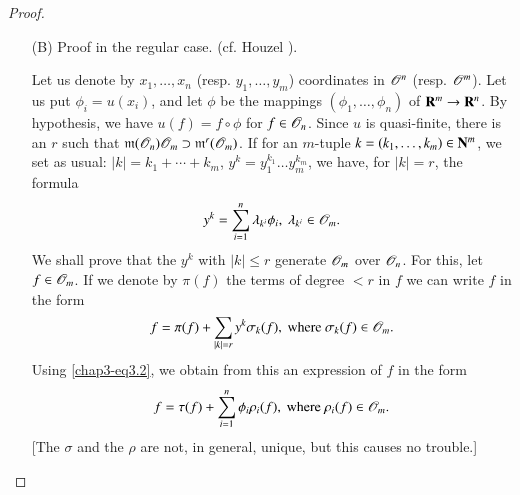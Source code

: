 \begin{proof}
\begin{itemize}
Let us, therefore, suppose that $\frakp$ is finitely generated, and let $g_{1},\ldots,g_{p}$ be a system of generators. Let us denote by $y_{i}(1\leq i\leq n)$ resp. $z_{j}(n+1\leq j\leq n+p)$ generators of the maximal ideal of $\scrO_{n}$ (resp. $\scrO_{n+p}$), and let $v$ be the morphism $\scrO_{n+p}\to \scrO_{m}$ defined by the formulas
\begin{align*}
& v(z_{i})=\widetilde{u}(y_{i}), \ 1\leq i\leq n\\
& v(z_{n+j})=g_{j}, \ 1\leq j\leq p.
\end{align*}
The morphism $v$ is still quasi-finite; if $v$ is finite, then so is $u$. We are thus reduced, after a change of notation, to the case $A=\scrO_{n}$, $B=\scrO_{m}$.

\item[(B)] {\rm Proof in the regular case.} (cf. Houzel \cite{C. Houzel : 1}).

Let us denote by $x_{1},\ldots,x_{n}$ (resp. $y_{1},\ldots,y_{m}$) coordinates in $\mathscr{O}^{n}$ (resp. $\mathscr{O}^{m}$). Let us put $\phi_{i}=u(x_{i})$, and let $\phi$ be the mappings $(\phi_{1},\ldots,\phi_{n})$ of $\mathbf{R}^{m}\to \mathbf{R}^{n}$. By hypothesis, we have $u(f)=f\circ \phi$ for $f\in \mathscr{O}_{n}$. Since $u$ is quasi-finite, there is an $r$ such that $\mathfrak{m}(\mathscr{O}_{n})\mathscr{O}_{m}\supset \mathfrak{m}^{r}(\mathscr{O}_{m})$. If for an $m$-tuple $k=(k_{1},\ldots,k_{m})\in \mathbf{N}^{m}$, we set as usual: $|k|=k_{1}+\cdots+k_{m}$, $y^{k}=y^{k_{1}}_{1}\ldots y^{k_{m}}_{m}$, we have, for $|k|=r$, the formula
\setcounter{equation}{1}
\begin{equation}
y^{k}=\sum\limits^{n}_{i=1}\lambda_{k^{i}}\phi_{i}, \ \lambda_{k^{i}}\in \mathscr{O}_{m}.\label{chap3-eq3.2}
\end{equation}
We shall prove that the $y^{k}$ with $|k|\leq r$ generate $\mathscr{O}_{m}$ over $\scrO_{n}$. For this, let $f\in \mathscr{O}_{m}$. If we denote by $\pi(f)$ the terms of degree $<r$ in $f$ we can write $f$ in the form
\begin{equation}
f=\pi(f)+\sum\limits_{|k|=r}y^{k}\sigma_{k}(f),\text{ where } \sigma_{k}(f)\in \mathscr{O}_{m}.\label{chap3-eq3.3}
\end{equation}\pageoriginale
Using \eqref{chap3-eq3.2}, we obtain from this an expression of $f$ in the form
\begin{equation}
f=\tau(f)+\sum\limits^{n}_{i=1}\phi_{i}\rho_{i}(f),\text{ where } \rho_{i}(f)\in \mathscr{O}_{m}.\label{chap3-eq3.4}
\end{equation}
[The $\sigma$ and the $\rho$ are not, in general, unique, but this causes no trouble.]


\end{itemize}
\end{proof}
